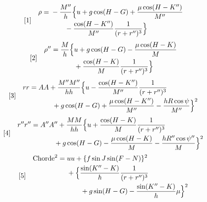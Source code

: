 \[
\begin{array}{l@{\quad}l}
[1]&\begin{aligned}
\rho={}&-\frac{M''}{h}\Bigl\{u+g\cos(H-G)+\frac{\mu\cos(H-K'')}{M''}\\
&\qquad{}-\frac{\cos(H-K'')}{M''}\frac{1}{(r+r'')^3}\Bigr\}
\end{aligned}
\end{array}
\]
\[
\begin{array}{l@{\quad}l}
[2]&\begin{aligned}
\rho''={}&\frac{M}{h}\Bigl\{u+g\cos(H-G)-\frac{\mu\cos(H-K)}{M}\\
&\qquad{}+\frac{\cos(H-K)}{M}\frac{1}{(r+r'')^3}\Bigr\}
\end{aligned}
\end{array}
\]
\[
\begin{array}{l@{\quad}l}
[3]&\begin{aligned}
rr={}&AA+\frac{M''M''}{hh}\Bigl\{u-\frac{\cos(H-K'')}{M''}\frac{1}{(r+r'')^3}\\
&\qquad{}+g\cos(H-G)+\frac{\mu\cos(H-K'')}{M''}-\frac{hR\cos\psi}{M''}\Bigr\}^2
\end{aligned}
\end{array}
\]
\[
\begin{array}{l@{\quad}l}
[4]&\begin{aligned}
r''r''={}&A''A''+\frac{MM}{hh}\Bigl\{u+\frac{\cos(H-K)}{M}\frac{1}{(r+r'')^3}\\
&\qquad{}+g\cos(H-G)-\frac{\mu\cos(H-K)}{M}-\frac{hR''\cos\psi''}{M}\Bigr\}^2
\end{aligned}
\end{array}
\]
\[
\begin{array}{l@{\quad}l}
[5]&\begin{aligned}
\text{Chorde}^2={}&uu+\{f\sin J\sin(F-N)\}^2\\
&+\Bigl\{\frac{\sin(K''-K)}{h}\frac{1}{(r+r'')^3}\\
&\qquad{}+g\sin(H-G)-\frac{\sin(K''-K)}{h}\mu\Bigr\}^2
\end{aligned}
\end{array}
\]

